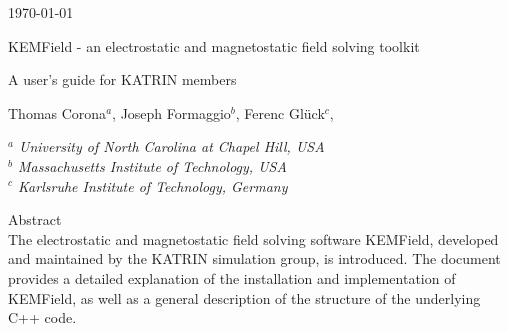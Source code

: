 \documentclass[11pt,a4paper,oneside]{article}
\newcommand{\katrin}     {{\sc KATRIN }}
\newcommand{\kemfield}    {{\sc KEMField}}
\begin{document}
\begin{titlepage}

\begin{figure}
\end{figure} 

\hspace{10.8cm} \today \\ 

\begin{center}

\vspace{1.0cm}

{\Large KEMField - an electrostatic and magnetostatic field solving toolkit \\ } 

\vspace{0.5cm} 

{\large A user's guide for \katrin members\\ }

\vspace{1.0cm}

{\large 
Thomas Corona$^{a}$,
Joseph Formaggio$^{b}$,
Ferenc Gl\"{u}ck$^{c}$, 
}

\vspace{1.0cm}

{\it 
$^{a}$ University of North Carolina at Chapel Hill, USA \\
$^{b}$ Massachusetts Institute of Technology, USA \\ 
$^{c}$ Karlsruhe Institute of Technology, Germany
} 
\vspace{2.0cm} 

\end{center} 

{\large Abstract} \\ 

The electrostatic and magnetostatic field solving software \kemfield, developed and maintained by the \katrin simulation group, is introduced. The document provides a detailed explanation of the installation and implementation of \kemfield, as well as a general description of the structure of the underlying C++ code. 

\end{titlepage}
\end{document}
